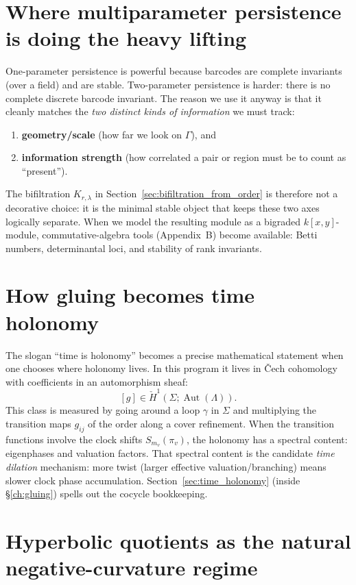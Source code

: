 \documentclass[11pt,oneside]{amsbook}
\numberwithin{equation}{section}
\theoremstyle{plain}
\theoremstyle{definition}
\theoremstyle{remark}
\DeclareMathOperator{\Aut}{\mathrm{Aut}}
\begin{document}
\section*{Where multiparameter persistence is doing the heavy lifting}

One-parameter persistence is powerful because barcodes are complete invariants (over a field) and are stable.
Two-parameter persistence is harder: there is no complete discrete barcode invariant.
The reason we use it anyway is that it cleanly matches the \emph{two distinct kinds of information} we must track:
\begin{enumerate}
\item \textbf{geometry/scale} (how far we look on $\Gamma$), and
\item \textbf{information strength} (how correlated a pair or region must be to count as ``present'').
\end{enumerate}

The bifiltration $K_{r,\lambda}$ in Section~\ref{sec:bifiltration_from_order} is therefore not a decorative choice:
it is the minimal stable object that keeps these two axes logically separate.
When we model the resulting module as a bigraded $k[x,y]$-module, commutative-algebra tools (Appendix~B) become available:
Betti numbers, determinantal loci, and stability of rank invariants.

\section*{How gluing becomes time holonomy}
\label{sec:time_holonomy}

The slogan ``time is holonomy'' becomes a precise mathematical statement when one chooses where holonomy lives.
In this program it lives in \v{C}ech cohomology with coefficients in an automorphism sheaf:
\[
[g]\in \check{H}^1(\Sigma;\Aut(\Lambda)).
\]
This class is measured by going around a loop $\gamma$ in $\Sigma$ and multiplying the transition maps $g_{ij}$ of the order along a cover refinement.
When the transition functions involve the clock shifts $S_{m_v}(\pi_v)$, the holonomy has a spectral content: eigenphases and valuation factors.
That spectral content is the candidate \emph{time dilation} mechanism: more twist (larger effective valuation/branching) means slower clock phase accumulation.
Section~\ref{sec:time_holonomy} (inside \S\ref{ch:gluing}) spells out the cocycle bookkeeping.

\section*{Hyperbolic quotients as the natural negative-curvature regime}
\end{document}
